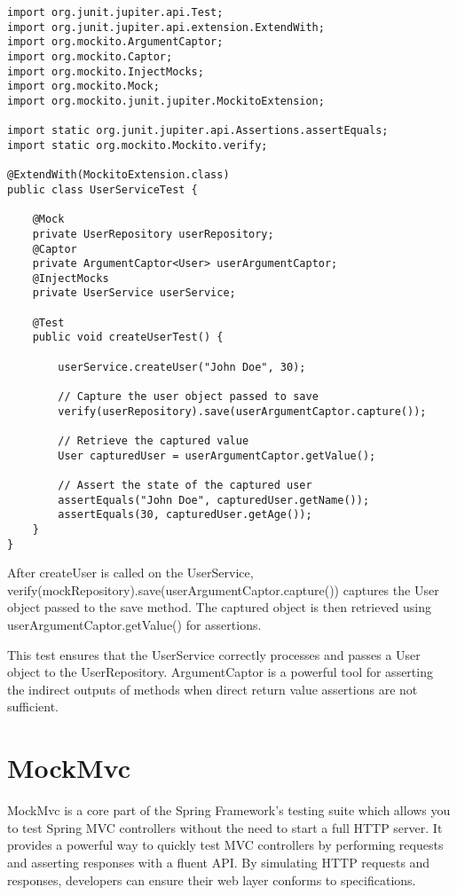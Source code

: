 \begin{lstlisting}
import org.junit.jupiter.api.Test;
import org.junit.jupiter.api.extension.ExtendWith;
import org.mockito.ArgumentCaptor;
import org.mockito.Captor;
import org.mockito.InjectMocks;
import org.mockito.Mock;
import org.mockito.junit.jupiter.MockitoExtension;

import static org.junit.jupiter.api.Assertions.assertEquals;
import static org.mockito.Mockito.verify;

@ExtendWith(MockitoExtension.class)
public class UserServiceTest {

    @Mock
    private UserRepository userRepository;
    @Captor
    private ArgumentCaptor<User> userArgumentCaptor;
    @InjectMocks
    private UserService userService;

    @Test
    public void createUserTest() {

        userService.createUser("John Doe", 30);

        // Capture the user object passed to save
        verify(userRepository).save(userArgumentCaptor.capture());

        // Retrieve the captured value
        User capturedUser = userArgumentCaptor.getValue();

        // Assert the state of the captured user
        assertEquals("John Doe", capturedUser.getName());
        assertEquals(30, capturedUser.getAge());
    }
}
\end{lstlisting}

After createUser is called on the UserService, verify(mockRepository).save(userArgumentCaptor.capture()) captures the User object passed to the save method. The captured object is then retrieved using userArgumentCaptor.getValue() for assertions.

This test ensures that the UserService correctly processes and passes a User object to the UserRepository. ArgumentCaptor is a powerful tool for asserting the indirect outputs of methods when direct return value assertions are not sufficient.
 
 \section{MockMvc}
 
MockMvc is a core part of the Spring Framework's testing suite which allows you to test Spring MVC controllers without the need to start a full HTTP server. It provides a powerful way to quickly test MVC controllers by performing requests and asserting responses with a fluent API. By simulating HTTP requests and responses, developers can ensure their web layer conforms to specifications.
 
